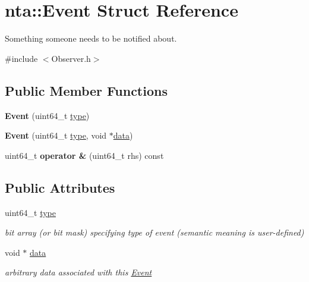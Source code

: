 \hypertarget{structnta_1_1Event}{}\section{nta\+:\+:Event Struct Reference}
\label{structnta_1_1Event}


Something someone needs to be notified about.  




{\ttfamily \#include $<$Observer.\+h$>$}

\subsection*{Public Member Functions}
\begin{DoxyCompactItemize}
\item 
\mbox{\label{structnta_1_1Event_a5f002263de60148df2abcffcf94330f7}} 
{\bfseries Event} (uint64\+\_\+t \hyperlink{structnta_1_1Event_a0d5af902fd256daec7ad0df501efbd4d}{type})
\item 
\mbox{\label{structnta_1_1Event_a45bd6ce9123d22e07ce7ae58afb1460d}} 
{\bfseries Event} (uint64\+\_\+t \hyperlink{structnta_1_1Event_a0d5af902fd256daec7ad0df501efbd4d}{type}, void $\ast$\hyperlink{structnta_1_1Event_af9008b4870960d8070d500c9ecd2c2d6}{data})
\item 
\mbox{\label{structnta_1_1Event_afaeba9d4a9b04b5ea25c9d9840920387}} 
uint64\+\_\+t {\bfseries operator \&} (uint64\+\_\+t rhs) const
\end{DoxyCompactItemize}
\subsection*{Public Attributes}
\begin{DoxyCompactItemize}
\item 
\mbox{\label{structnta_1_1Event_a0d5af902fd256daec7ad0df501efbd4d}} 
uint64\+\_\+t \hyperlink{structnta_1_1Event_a0d5af902fd256daec7ad0df501efbd4d}{type}
\begin{DoxyCompactList}\small\item\em bit array (or bit mask) specifying type of event (semantic meaning is user-\/defined) \end{DoxyCompactList}\item 
\mbox{\label{structnta_1_1Event_af9008b4870960d8070d500c9ecd2c2d6}} 
void $\ast$ \hyperlink{structnta_1_1Event_af9008b4870960d8070d500c9ecd2c2d6}{data}
\begin{DoxyCompactList}\small\item\em arbitrary data associated with this \hyperlink{structnta_1_1Event}{Event} \end{DoxyCompactList}\end{DoxyCompactItemize}


